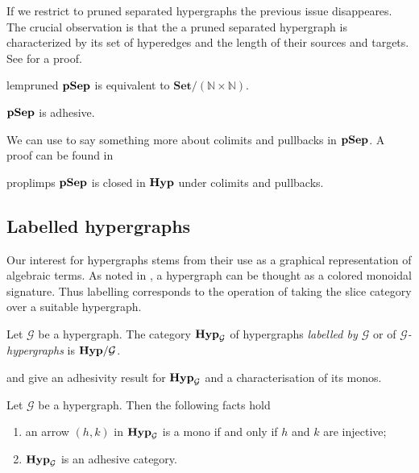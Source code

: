 \documentclass[3p]{elsarticle}
\newcommand{\Set}{\mathbf{Set}}
\newcommand{\catname}[1]{\textbf{\textup{#1}}}
\newcommand{\hyp}{\catname{Hyp}}
\newcommand{\pshyp}{\catname{pSep}}
\theoremstyle{remark}
\theoremstyle{definition}
\begin{document}
\smallskip
If we restrict to pruned separated hypergraphs the previous issue disappeares.  The crucial observation is that the a pruned separated hypergraph is characterized by its set of hyperedges and the length of their sources and targets. See  for a proof.

\begin{restatable}{lem}{pruned}\label{lem:pruned}
$\pshyp$ is equivalent to $\Set/(\mathbb{N}\times \mathbb{N})$.
\end{restatable}
\begin{cor}\label{cor:pruned}
	$\pshyp$ is adhesive.
\end{cor}


We can use  to say something more about colimits and pullbacks in $\pshyp$. A proof can be found in 

\begin{restatable}{prop}{limps}\label{prop:limpsy}
	$\pshyp$ is closed in $\hyp$ under colimits and pullbacks.
\end{restatable}


\subsection{Labelled hypergraphs}\label{sssect:hyp_alg_sign}

Our interest for hypergraphs stems from their use as a graphical representation of algebraic terms. As  noted in , a hypergraph can be thought as a colored monoidal signature. Thus labelling corresponds to the operation of taking the slice category over a suitable hypergraph. 

\begin{defi}
	Let $\mathcal{G}$ be a hypergraph. The category $\hyp_\mathcal{G}$ of hypergraphs \emph{labelled by $\mathcal{G}$}  or of \emph{$\mathcal{G}$-hypergraphs} is $\hyp/\mathcal{G}$.
\end{defi}


 and  give an adhesivity result for $\hyp_{\mathcal{G}}$ and a characterisation of its monos.

\begin{prop}\label{prop:mono} Let $\mathcal{G}$ be a hypergraph. Then the following facts hold
	\begin{enumerate}
		\item an arrow $(h,k)$ in $\hyp_{\mathcal{G}}$ is a mono if and only if $h$ and $k$ are injective;
		\item $\hyp_{\mathcal{G}}$ is an adhesive category. 
	\end{enumerate}
\end{prop}
\end{document}
